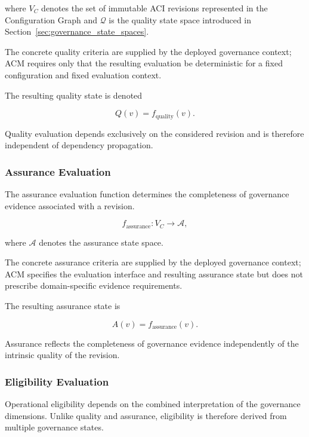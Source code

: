 \documentclass[10pt]{article}
\begin{document}
where $V_C$ denotes the set of immutable ACI revisions represented in the Configuration Graph and $\mathcal{Q}$ is the quality state space introduced in Section~\ref{sec:governance_state_spaces}.

The concrete quality criteria are supplied by the deployed governance context; ACM requires only that the resulting evaluation be deterministic for a fixed configuration and fixed evaluation context.

The resulting quality state is denoted

\begin{equation}
	Q(v)=f_{\mathrm{quality}}(v).
	\label{eq:quality_assignment}
\end{equation}

Quality evaluation depends exclusively on the considered revision and is therefore independent of dependency propagation.

\subsubsection{Assurance Evaluation}

The assurance evaluation function determines the completeness of governance evidence associated with a revision.

\begin{equation}
	f_{\mathrm{assurance}} : V_C \rightarrow \mathcal{A},
	\label{eq:f_assurance}
\end{equation}

where $\mathcal{A}$ denotes the assurance state space.

The concrete assurance criteria are supplied by the deployed governance context; ACM specifies the evaluation interface and resulting assurance state but does not prescribe domain-specific evidence requirements.

The resulting assurance state is

\begin{equation}
	A(v)=f_{\mathrm{assurance}}(v).
	\label{eq:assurance_assignment}
\end{equation}

Assurance reflects the completeness of governance evidence independently of the intrinsic quality of the revision.

\subsubsection{Eligibility Evaluation}

Operational eligibility depends on the combined interpretation of the governance dimensions. Unlike quality and assurance, eligibility is therefore derived from multiple governance states.
\end{document}
